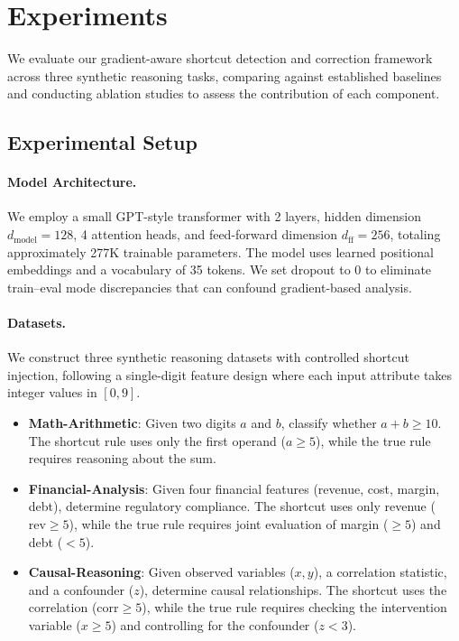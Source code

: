 \section{Experiments}
\label{sec:experiments}

We evaluate our gradient-aware shortcut detection and correction framework across three synthetic reasoning tasks, comparing against established baselines and conducting ablation studies to assess the contribution of each component.

\subsection{Experimental Setup}
\label{sec:exp_setup}

\paragraph{Model Architecture.}
We employ a small GPT-style transformer with 2 layers, hidden dimension $d_{\text{model}} = 128$, 4 attention heads, and feed-forward dimension $d_{\text{ff}} = 256$, totaling approximately 277K trainable parameters. The model uses learned positional embeddings and a vocabulary of 35 tokens. We set dropout to 0 to eliminate train--eval mode discrepancies that can confound gradient-based analysis.

\paragraph{Datasets.}
We construct three synthetic reasoning datasets with controlled shortcut injection, following a single-digit feature design where each input attribute takes integer values in $[0, 9]$.

\begin{itemize}[leftmargin=*, itemsep=2pt]
    \item \textbf{Math-Arithmetic}: Given two digits $a$ and $b$, classify whether $a + b \geq 10$. The shortcut rule uses only the first operand ($a \geq 5$), while the true rule requires reasoning about the sum.
    \item \textbf{Financial-Analysis}: Given four financial features (revenue, cost, margin, debt), determine regulatory compliance. The shortcut uses only revenue ($\text{rev} \geq 5$), while the true rule requires joint evaluation of margin ($\geq 5$) and debt ($< 5$).
    \item \textbf{Causal-Reasoning}: Given observed variables ($x, y$), a correlation statistic, and a confounder ($z$), determine causal relationships. The shortcut uses the correlation ($\text{corr} \geq 5$), while the true rule requires checking the intervention variable ($x \geq 5$) and controlling for the confounder ($z < 3$).
\end{itemize}

